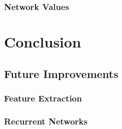 \documentclass[12pt]{article}
\begin{document}
\subsubsection{Network Values}

\section{Conclusion}

\subsection{Future Improvements}

\subsubsection{Feature Extraction}

\subsubsection{Recurrent Networks}


\newpage


\end{document}
